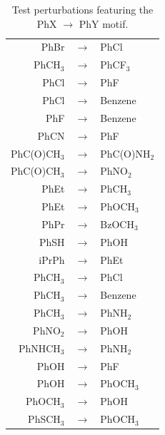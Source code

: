 \documentclass[12pt]{report}
\begin{document}
\begin{table}[p]
\centering
\caption{Test perturbations featuring the PhX $\longrightarrow$ PhY motif.}
\begin{tabular}{rcl}
\toprule
PhBr  & $\longrightarrow$ &  PhCl \\
PhCH$_3$         & $\longrightarrow$ & PhCF$_3$   \\
PhCl         & $\longrightarrow$ & PhF  \\
PhCl         & $\longrightarrow$ & Benzene   \\
PhF         & $\longrightarrow$ &  Benzene \\
PhCN       & $\longrightarrow$ &  PhF \\
PhC(O)CH$_3$  & $\longrightarrow$ & PhC(O)NH$_2$  \\
PhC(O)CH$_3$  & $\longrightarrow$ & PhNO$_2$  \\
PhEt         & $\longrightarrow$ & PhCH$_3$  \\
PhEt         & $\longrightarrow$ & PhOCH$_3$  \\
PhPr         & $\longrightarrow$ & BzOCH$_3$ \\
PhSH         & $\longrightarrow$ & PhOH  \\
iPrPh         & $\longrightarrow$ & PhEt  \\
PhCH$_3$         & $\longrightarrow$ & PhCl   \\
PhCH$_3$         & $\longrightarrow$ & Benzene  \\
PhCH$_3$         & $\longrightarrow$ & PhNH$_{2}$  \\
PhNO$_2$     & $\longrightarrow$ & PhOH  \\
PhNHCH$_3$       & $\longrightarrow$ & PhNH$_{2}$  \\ 
PhOH         & $\longrightarrow$ &  PhF \\
PhOH          & $\longrightarrow$ & PhOCH$_3$  \\
PhOCH$_3$        & $\longrightarrow$ & PhOH  \\
PhSCH$_3$         & $\longrightarrow$ & PhOCH$_3$  \\
\bottomrule
\end{tabular}
\label{phxphy}
\end{table} 

\end{document}
